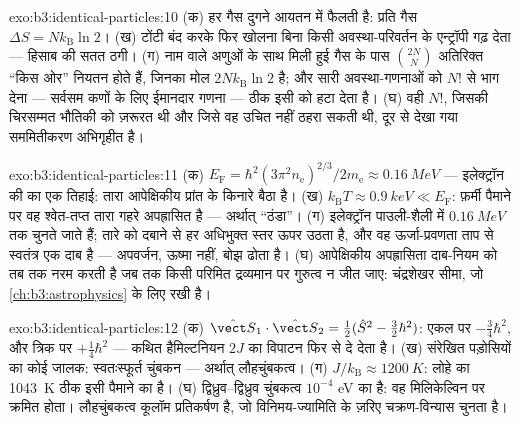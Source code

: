 \begin{solution}{exo:b3:identical-particles:10}
(क) हर गैस दुगने आयतन में फैलती है: प्रति गैस $\Delta S =
Nk_{\text{B}}\ln2$। (ख) टोंटी बंद करके फिर खोलना बिना किसी
अवस्था-परिवर्तन के एन्ट्रॉपी गढ़ देता ---
हिसाब की सतत ठगी। (ग)
नाम वाले अणुओं के साथ मिली हुई गैस के पास $\binom{2N}{N}$ अतिरिक्त
``किस ओर'' नियतन होते हैं, जिनका मोल $2Nk_{\text{B}}\ln2$ है; और सारी
अवस्था-गणनाओं को $N!$ से भाग देना ---
सर्वसम कणों के लिए ईमानदार गणना --- ठीक इसी को हटा देता है।
(घ) वही $N!$, जिसकी चिरसम्मत भौतिकी को ज़रूरत थी और जिसे वह उचित नहीं
ठहरा सकती थी, दूर से देखा गया सममितीकरण अभिगृहीत है।
\end{solution}

\begin{solution}{exo:b3:identical-particles:11}
(क) $E_{\text{F}} = \hbar^2(3\pi^2n_{\text{e}})^{2/3}/2m_{\text{e}}
\approx \qty{0.16}{MeV}$ --- इलेक्ट्रॉन की  का एक तिहाई: तारा आपेक्षिकीय प्रांत के किनारे बैठा है। (ख)
$k_{\text{B}}T \approx \qty{0.9}{keV} \ll E_{\text{F}}$: फ़र्मी
पैमाने पर वह श्वेत-तप्त तारा गहरे अपह्रासित है --- अर्थात् ``ठंडा''।
(ग) इलेक्ट्रॉन पाउली-शैली में
$\qty{0.16}{MeV}$ तक चुनते जाते हैं; तारे को दबाने से हर अधिभुक्त
स्तर ऊपर उठता है, और वह ऊर्जा-प्रवणता ताप से स्वतंत्र एक दाब है ---
अपवर्जन, ऊष्मा नहीं, बोझ ढोता है। (घ)
आपेक्षिकीय अपह्रासिता दाब-नियम को तब तक नरम करती है जब तक किसी परिमित
द्रव्यमान पर गुरुत्व न जीत जाए: चंद्रशेखर सीमा, जो
\cref{ch:b3:astrophysics} के लिए रखी है।
\end{solution}

\begin{solution}{exo:b3:identical-particles:12}
(क) $\hat{\vect S}_1\cdot\hat{\vect S}_2 = \tfrac12(\hat S^2 -
\tfrac32\hbar^2)$: एकल पर $-\tfrac34\hbar^2$,
और त्रिक पर $+\tfrac14\hbar^2$ --- कथित हैमिल्टनियन
$2J$ का विपाटन फिर से दे देता है। (ख) संरेखित पड़ोसियों का कोई जालक:
स्वतःस्फूर्त चुंबकन --- अर्थात् लौहचुंबकत्व। (ग) $J/k_{\text{B}}
\approx \qty{1200}{K}$: लोहे का \qty{1043}{K} ठीक इसी
पैमाने का है। (घ) द्विध्रुव--द्विध्रुव चुंबकत्व $10^{-4}$ eV का है:
वह मिलिकेल्विन पर क्रमित होता। लौहचुंबकत्व कूलॉम प्रतिकर्षण है, जो
विनिमय-ज्यामिति के ज़रिए चक्रण-विन्यास चुनता है।
\end{solution}

